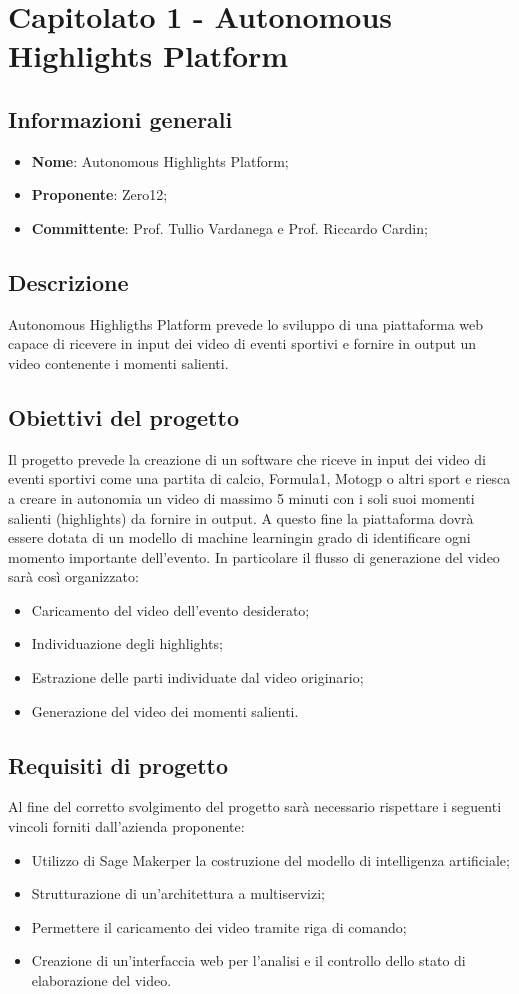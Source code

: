 \section{Capitolato 1 - Autonomous Highlights Platform}
\subsection{Informazioni generali}
\begin{itemize}
	\item \textbf{Nome}: Autonomous Highlights Platform;
	\item \textbf{Proponente}: Zero12;
	\item \textbf{Committente}: Prof. Tullio Vardanega e Prof. Riccardo Cardin;
\end{itemize}
\subsection{Descrizione}
Autonomous Highligths Platform prevede lo sviluppo di una piattaforma web capace di ricevere in input dei video di eventi sportivi e fornire in output un video contenente i momenti salienti.
\subsection{Obiettivi del progetto}
Il progetto prevede la creazione di un software che riceve in input dei video di eventi sportivi come una partita di calcio, Formula1, Motogp o altri sport e riesca a creare in autonomia un video di massimo 5 minuti con i soli suoi momenti salienti (highlights) da fornire in output. A questo fine la piattaforma dovrà essere dotata di un modello di machine learning\glosp in grado di identificare ogni momento importante dell’evento.
In particolare il flusso di generazione del video sarà così organizzato:
\begin{itemize}
	\item Caricamento del video dell'evento desiderato;
	\item Individuazione degli highlights;
	\item Estrazione delle parti individuate dal video originario;
	\item Generazione del video dei momenti salienti.
\end{itemize}
\subsection{Requisiti di progetto}
Al fine del corretto svolgimento del progetto sarà necessario rispettare i seguenti vincoli forniti dall'azienda proponente:
\begin{itemize}
	\item Utilizzo di Sage Maker\glosp per la costruzione del modello di intelligenza artificiale\glo;
	\item Strutturazione di un'architettura a multiservizi\glo;
	\item Permettere il caricamento dei video tramite riga di comando;
	\item Creazione di un'interfaccia web per l'analisi e il controllo dello stato di elaborazione del video.
\end{itemize}
